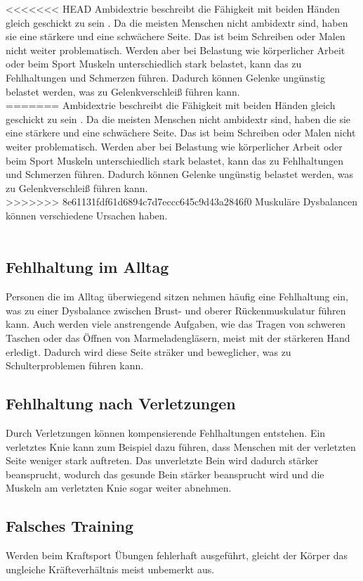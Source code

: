 
<<<<<<< HEAD
Ambidextrie beschreibt die Fähigkeit mit beiden Händen gleich geschickt zu sein \cite{wissen.de}. Da die meisten  Menschen nicht ambidextr sind, haben sie eine stärkere und eine schwächere Seite. Das ist beim Schreiben oder Malen nicht weiter problematisch. Werden aber bei Belastung wie körperlicher Arbeit oder beim Sport Muskeln unterschiedlich stark belastet, kann das zu Fehlhaltungen und Schmerzen führen. Dadurch können Gelenke ungünstig belastet werden, was zu Gelenkverschleiß führen kann.\\
=======
Ambidextrie beschreibt die Fähigkeit mit beiden Händen gleich geschickt zu sein \cite{wissen}. Da die meisten  Menschen nicht ambidextr sind, haben die sie eine stärkere und eine schwächere Seite. Das ist beim Schreiben oder Malen nicht weiter problematisch. Werden aber bei Belastung wie körperlicher Arbeit oder beim Sport Muskeln unterschiedlich stark belastet, kann das zu Fehlhaltungen und Schmerzen führen. Dadurch können Gelenke ungünstig belastet werden, was zu Gelenkverschleiß führen kann.\\
>>>>>>> 8e61131fdf61d6894c7d7eccc645c9d43a2846f0
Muskuläre Dysbalancen können verschiedene Ursachen haben. \\
\\
 \subsection{Fehlhaltung im Alltag}
 Personen die im Alltag überwiegend sitzen nehmen häufig eine Fehlhaltung ein, was zu einer Dysbalance zwischen Brust- und oberer Rückenmuskulatur führen kann. Auch werden viele anstrengende Aufgaben, wie das Tragen von schweren Taschen oder das Öffnen von Marmeladengläsern, meist mit der stärkeren Hand erledigt. Dadurch wird diese Seite sträker und beweglicher, was zu Schulterproblemen führen kann.

 \subsection{Fehlhaltung nach Verletzungen}
 Durch Verletzungen können kompensierende Fehlhaltungen entstehen. Ein verletztes Knie kann zum Beispiel dazu führen, dass Menschen mit der verletzten Seite weniger stark auftreten. Das unverletzte Bein wird dadurch stärker beansprucht, wodurch das gesunde Bein stärker beansprucht wird und die Muskeln am verletzten Knie sogar weiter abnehmen.

 \subsection{Falsches Training}
Werden beim Kraftsport Übungen fehlerhaft ausgeführt, gleicht der Körper das ungleiche Kräfteverhältnis meist unbemerkt aus.

